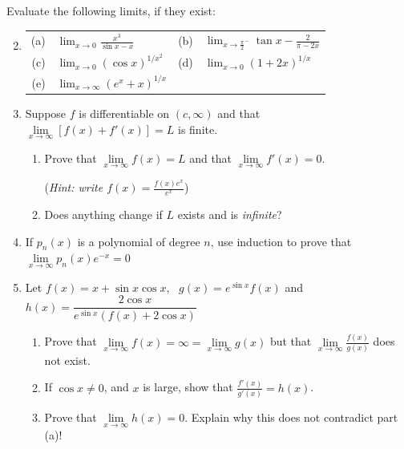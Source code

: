 \begin{exercises}
	\exstart Evaluate the following limits, if they exist:\vspace{-5pt}
	\begin{enumerate}\setcounter{enumi}{1}
	  \item[]\renewcommand{\arraystretch}{1.5}
	  \begin{tabular}{r@{\ \ }l@{\qquad\quad}r@{\ \ }l}
		  (a)
		  &
		  $\displaystyle\lim_{x\to 0}\frac{x^3}{\sin x-x}$
		  &
		  (b)
		  &
		  $\displaystyle\lim_{x\to {\frac\pi 2}^-}\tan x-\frac 2{\pi-2x}$
		  \\
		  (c)
		  &
		  $\displaystyle\lim_{x\to 0}(\cos x)^{1/x^2}$
			&
			(d)
			&
			$\displaystyle\lim_{x\to 0}(1+2x)^{1/x}$
			\\
			(e)
			&
			$\displaystyle\lim_{x\to \infty}(e^x+x)^{1/x}$
		  &
	  \end{tabular}
	  	
	  	
		\item Suppose $f$ is differentiable on $(c,\infty)$ and that $\lim\limits_{x\to\infty}[f(x)+f'(x)]=L$ is finite.
		\begin{enumerate}
		  \item Prove that $\lim\limits_{x\to\infty}f(x)=L$ and that $\lim\limits_{x\to\infty}f'(x)=0$.\par
			(\emph{Hint: write $f(x)=\frac{f(x)e^x}{e^x}$})
			
			\item Does anything change if $L$ exists and is \emph{infinite}?
		\end{enumerate}
		
		
		\item\label{exs:pnexplimit} If $p_n(x)$ is a polynomial of degree $n$, use induction to prove that $\lim\limits_{x\to\infty}p_n(x)e^{-x}=0$
		
		
		\item Let $f(x)=x+\sin x\cos x$, \ $g(x)=e^{\sin x}f(x)$ and $h(x)=\dfrac{2\cos x}{e^{\sin x}(f(x)+2\cos x)}$
		\begin{enumerate}
		  \item Prove that $\lim\limits_{x\to\infty}f(x)=\infty=\lim\limits_{x\to\infty}g(x)$ but that $\lim\limits_{x\to\infty}\frac{f(x)}{g(x)}$ does not exist.
		  
		  \item If $\cos x\neq 0$, and $x$ is large, show that $\frac{f'(x)}{g'(x)}=h(x)$.
		  
		  \item Prove that $\lim\limits_{x\to\infty}h(x)=0$. Explain why this does not contradict part (a)!
		\end{enumerate}
	\end{enumerate}
\end{exercises}


